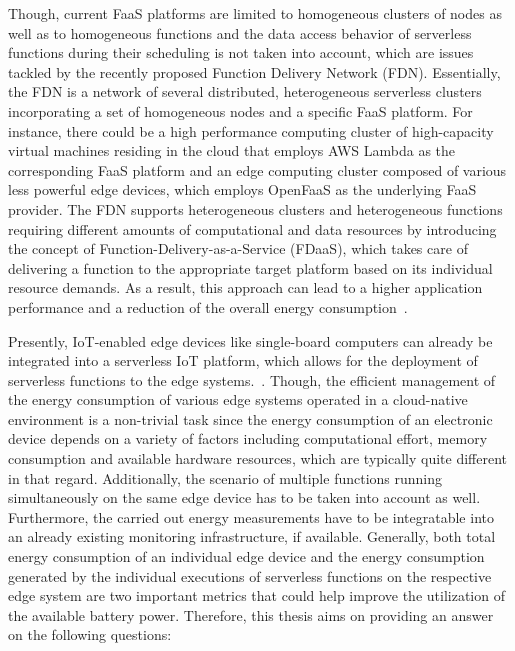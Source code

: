 Though, current FaaS platforms are limited to homogeneous clusters of nodes as well as to homogeneous functions and the data access behavior of serverless functions during their scheduling is not taken into account, which are issues tackled by the recently proposed Function Delivery Network (FDN). Essentially, the FDN is a network of several distributed, heterogeneous serverless clusters incorporating a set of homogeneous nodes and a specific FaaS platform. For instance, there could be a high performance computing cluster of high-capacity virtual machines residing in the cloud that employs AWS Lambda as the corresponding FaaS platform and an edge computing cluster composed of various less powerful edge devices, which employs OpenFaaS as the underlying FaaS provider. The FDN supports heterogeneous clusters and heterogeneous functions requiring different amounts of computational and data resources by introducing the concept of Function-Delivery-as-a-Service (FDaaS), which takes care of delivering a function to the appropriate target platform based on its individual resource demands. As a result, this approach can lead to a higher application performance and a reduction of the overall energy consumption~\parencite{fdn}.

Presently, IoT-enabled edge devices like single-board computers can already be integrated into a serverless IoT platform, which allows for the deployment of serverless functions to the edge systems.~\parencite{fdn}. Though, the efficient management of the energy consumption of various edge systems operated in a cloud-native environment is a non-trivial task since the energy consumption of an electronic device depends on a variety of factors including computational effort, memory consumption and available hardware resources, which are typically quite different in that regard. Additionally, the scenario of multiple functions running simultaneously on the same edge device has to be taken into account as well. Furthermore, the carried out energy measurements have to be integratable into an already existing monitoring infrastructure, if available. Generally, both total energy consumption of an individual edge device and the energy consumption generated by the individual executions of serverless functions on the respective edge system are two important metrics that could help improve the utilization of the available battery power. Therefore, this thesis aims on providing an answer on the following questions:

